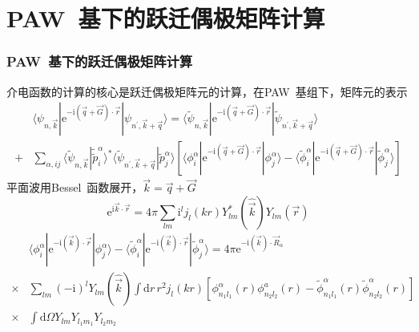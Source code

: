 \documentclass[cjk,slidestop,compress,mathserif,blue]{beamer}
\begin{document}


\appendix
\section{\rm{PAW~}基下的跃迁偶极矩阵计算}
\frame
{
	\frametitle{\textrm{PAW~}基下的跃迁偶极矩阵计算}
	介电函数的计算的核心是跃迁偶极矩阵元的计算，在\textrm{PAW~}基组下，矩阵元的表示
	\begin{displaymath}
		\begin{aligned}
			&\langle\psi_{n,\vec k}|\mathrm{e}^{-\mathrm{i}(\vec q+\vec G)\cdot\vec r}|\psi_{n^{\prime},\vec k+\vec q}\rangle=\langle\tilde{\psi}_{n,\vec k}|\mathrm{e}^{-\mathrm{i}(\vec q+\vec G)\cdot\vec r}|\tilde{\psi}_{n^{\prime},\vec k+\vec q}\rangle\\
			+&\sum_{\alpha,ij}\langle\tilde{\psi}_{n,\vec k}|\tilde\tilde{p}_i^{\alpha}\rangle^{\ast}\langle\tilde{\psi}_{n^{\prime},\vec k+\vec q}|\tilde{p}_j^{\alpha}\rangle[\langle\phi_i^{\alpha}|\mathrm{e}^{-\mathrm{i}(\vec q+\vec G)\cdot\vec r}|\phi_j^{\alpha}\rangle-\langle\tilde{\phi}_i^{\alpha}|\mathrm{e}^{-\mathrm{i}(\vec q+\vec G)\cdot\vec r}|\tilde{\phi}_j^{\alpha}\rangle]
		\end{aligned}
	\end{displaymath}
	平面波用\textrm{Bessel~}函数展开，$\vec k=\vec q+\vec G$
	\begin{displaymath}
		\mathrm{e}^{\mathrm{i}\vec k\cdot\vec r}=4\pi\sum_{lm}\mathrm{i}^lj_l(kr)Y_{lm}^{\ast}(\hat{\vec k})Y_{lm}(\vec r)
	\end{displaymath}
	\begin{displaymath}
		\begin{aligned}
			&\langle\phi_i^{\alpha}|\mathrm{e}^{-\mathrm{i}(\vec k)\cdot\vec r}|\phi_j^{\alpha}\rangle-\langle\tilde{\phi}_i^{\alpha}|\mathrm{e}^{-\mathrm{i}(\vec k)\cdot\vec r}|\tilde{\phi}_j^{\alpha}\rangle=4\pi\mathrm{e}^{-\mathrm{i}(\vec k)\cdot\vec R_{\alpha}}\\
			\times&\sum_{lm}(-\mathrm{i})^lY_{lm}(\widehat{\vec k})\int\mathrm{d}r\,r^2j_l(kr)[\phi_{n_1l_1}^{\alpha}(r)\phi_{n_2l_2}^a(r)-\tilde{\phi}_{n_1l_1}^{\alpha}(r)\tilde{\phi}_{n_2l_2}^{\alpha}(r)]\\
			\times&\int\mathrm{d}\Omega Y_{lm}Y_{l_1m_1}Y_{l_2m_2}
		\end{aligned}
	\end{displaymath}
}
\end{document}
